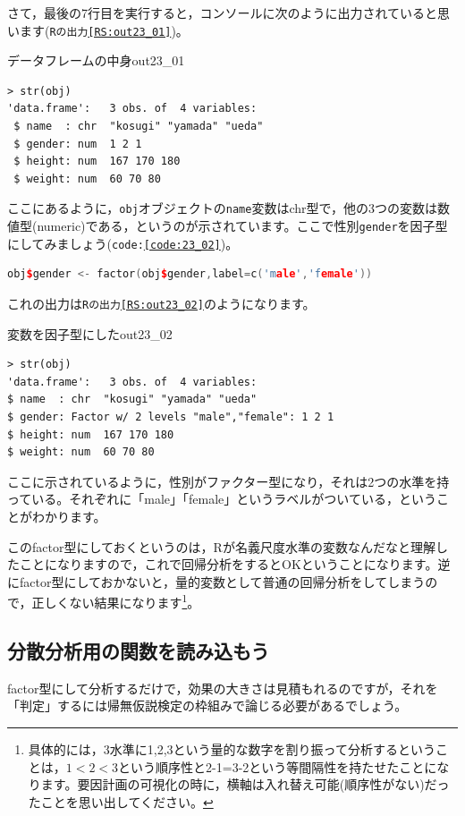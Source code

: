 \documentclass{ltjbook}
\begin{document}
さて，最後の7行目を実行すると，コンソールに次のように出力されていると思います(\texttt{Rの出力\ref{RS:out23_01}})。
\begin{Rscreen}{データフレームの中身}{out23_01}
	\begin{verbatim}
> str(obj)
'data.frame':	3 obs. of  4 variables:
 $ name  : chr  "kosugi" "yamada" "ueda"
 $ gender: num  1 2 1
 $ height: num  167 170 180
 $ weight: num  60 70 80
\end{verbatim}
\end{Rscreen}
ここにあるように，\texttt{obj}オブジェクトの\texttt{name}変数はchr型で，他の3つの変数は数値型(numeric)である，というのが示されています。ここで性別\texttt{gender}を因子型にしてみましょう(\texttt{code:\ref{code:23_02}})。

\begin{lstlisting}[language=c++,label={code:23_02},caption={因子型にする}]
obj$gender <- factor(obj$gender,label=c('male','female'))
\end{lstlisting}

これの出力は\texttt{Rの出力\ref{RS:out23_02}}のようになります。
\begin{Rscreen}{変数を因子型にした}{out23_02}
	\begin{verbatim}
> str(obj)
'data.frame':	3 obs. of  4 variables:
$ name  : chr  "kosugi" "yamada" "ueda"
$ gender: Factor w/ 2 levels "male","female": 1 2 1
$ height: num  167 170 180
$ weight: num  60 70 80
\end{verbatim}
\end{Rscreen}
ここに示されているように，性別がファクター型になり，それは2つの水準を持っている。それぞれに「male」「female」というラベルがついている，ということがわかります。

このfactor型にしておくというのは，Rが名義尺度水準の変数なんだなと理解したことになりますので，これで回帰分析をするとOKということになります。逆にfactor型にしておかないと，量的変数として普通の回帰分析をしてしまうので，正しくない結果になります\footnote{具体的には，3水準に1,2,3という量的な数字を割り振って分析するということは，$1<2<3$という順序性と2-1=3-2という等間隔性を持たせたことになります。要因計画の可視化の時に，横軸は入れ替え可能(順序性がない)だったことを思い出してください。}。

\subsection{分散分析用の関数を読み込もう}
factor型にして分析するだけで，効果の大きさは見積もれるのですが，それを「判定」するには帰無仮説検定の枠組みで論じる必要があるでしょう。
\end{document}
